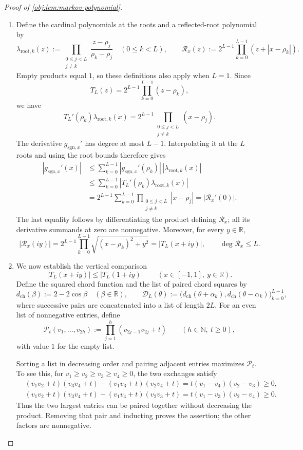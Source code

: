 \begin{proof}[Proof of \cref{obj:lem:markov-polynomial}]
\begin{enumerate}
\item Define the cardinal polynomials at the roots and a reflected-root polynomial by
\[
\lambda_{\mathrm{root},k}(z):=
\prod_{\substack{0\le j<L\\j\ne k}}
\frac{z-\rho_j}{\rho_k-\rho_j}
\quad(0\le k<L),
\qquad
\mathcal R_x(z):=
2^{L-1}\prod_{k=0}^{L-1}(z+|x-\rho_k|).
\]
Empty products equal \(1\), so these definitions also apply when \(L=1\).
Since
\[
T_L(z)=2^{L-1}\prod_{k=0}^{L-1}(z-\rho_k),
\]
we have
\[
T_L'(\rho_k)\lambda_{\mathrm{root},k}(x)
=
2^{L-1}\prod_{\substack{0\le j<L\\j\ne k}}(x-\rho_j).
\]
The derivative \(g_{\mathrm{sgn},x}'\) has degree at most \(L-1\). Interpolating it at the \(L\) roots and using the root bounds therefore gives
\[
\begin{aligned}
|g_{\mathrm{sgn},x}'(x)|
&\le\sum_{k=0}^{L-1}
|g_{\mathrm{sgn},x}'(\rho_k)|\,
|\lambda_{\mathrm{root},k}(x)|\\
&\le\sum_{k=0}^{L-1}
|T_L'(\rho_k)\lambda_{\mathrm{root},k}(x)|\\
&=2^{L-1}\sum_{k=0}^{L-1}
\prod_{\substack{0\le j<L\\j\ne k}}|x-\rho_j|
=|\mathcal R_x'(0)|.
\end{aligned}
\]
The last equality follows by differentiating the product defining
\(\mathcal R_x\); all its derivative summands at zero are nonnegative.
Moreover, for every \(y\in\mathbb R\),
\[
|\mathcal R_x(iy)|
=2^{L-1}\prod_{k=0}^{L-1}
\sqrt{(x-\rho_k)^2+y^2}
=|T_L(x+iy)|,
\qquad
\deg\mathcal R_x\le L.
\]

\item We now establish the vertical comparison
\[
|T_L(x+iy)|\le |T_L(1+iy)|
\qquad(x\in[-1,1],\ y\in\mathbb R).
\]
Define the squared chord function and the list of paired chord squares by
\[
d_{\mathrm{ch}}(\beta):=2-2\cos\beta
\quad(\beta\in\mathbb R),
\qquad
\mathscr D_L(\theta):=
\bigl(d_{\mathrm{ch}}(\theta+\alpha_k),
      d_{\mathrm{ch}}(\theta-\alpha_k)\bigr)_{k=0}^{L-1},
\]
where successive pairs are concatenated into a list of length \(2L\).
For an even list of nonnegative entries, define
\[
\mathcal P_t(v_1,\ldots,v_{2h})
:=\prod_{j=1}^{h}(v_{2j-1}v_{2j}+t)
\qquad(h\in\mathbb N,\ t\ge0),
\]
with value \(1\) for the empty list.

Sorting a list in decreasing order and pairing adjacent entries maximizes
\(\mathcal P_t\). To see this, for
\(v_1\ge v_2\ge v_3\ge v_4\ge0\), the two exchanges satisfy
\[
\begin{aligned}
&(v_1v_2+t)(v_3v_4+t)
 -(v_1v_3+t)(v_2v_4+t)
=t(v_1-v_4)(v_2-v_3)\ge0,\\
&(v_1v_2+t)(v_3v_4+t)
 -(v_1v_4+t)(v_2v_3+t)
=t(v_1-v_3)(v_2-v_4)\ge0.
\end{aligned}
\]
Thus the two largest entries can be paired together without decreasing the product. Removing that pair and inducting proves the assertion; the other factors are nonnegative.


\end{enumerate}
\end{proof}
